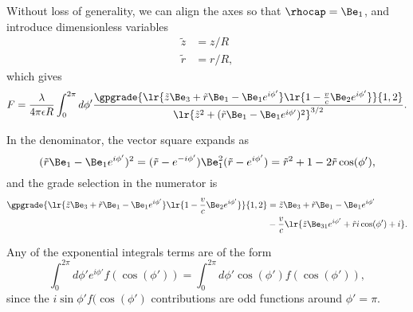 Without loss of generality, we can align the axes so that \( \rhocap = \Be_1 \), and
introduce dimensionless variables
\begin{equation}\label{eqn:ringField:100}
\begin{aligned}
\tilde{z} &= z/R \\
\tilde{r} &= r/R,
\end{aligned}
\end{equation}
which gives
\begin{dmath}\label{eqn:ringField:120}
F
= \frac{\lambda}{4 \pi \epsilon R} \int_0^{2\pi} d\phi' \frac{\gpgrade{ \lr{ \tilde{z} \Be_3 + \tilde{r} \Be_1 - \Be_1 e^{i\phi'} } \lr{ 1 - \frac{v}{c} \Be_2 e^{i\phi'} } }{1,2} } { \lr{ \tilde{z}^2 + (\tilde{r} \Be_1 - \Be_1 e^{i\phi'})^2}^{3/2} }.
\end{dmath}

In the denominator, the vector square expands as
\begin{dmath}\label{eqn:ringField:140}
(\tilde{r} \Be_1 - \Be_1 e^{i\phi'})^2
=
(\tilde{r} - e^{-i\phi'}) \Be_1^2 (\tilde{r} - e^{i\phi'})
=
\tilde{r}^2 + 1 - 2 \tilde{r} \cos(\phi'),
\end{dmath}
and the grade selection in the numerator is
\begin{equation}\label{eqn:ringField:160}
\begin{aligned}
\gpgrade{ \lr{ \tilde{z} \Be_3 + \tilde{r} \Be_1 - \Be_1 e^{i\phi'} } \lr{ 1 - \frac{v}{c} \Be_2 e^{i\phi'}}}{1,2}
&=
\tilde{z} \Be_3 + \tilde{r} \Be_1 - \Be_1 e^{i\phi'} \\
&-\frac{v}{c}\lr{ \tilde{z} \Be_{31} e^{i\phi'} + \tilde{r} i \cos(\phi') + i }.
\end{aligned}
\end{equation}

Any of the exponential integrals terms
are of the form
\begin{equation}\label{eqn:ringField:180}
\int_0^{2\pi} d\phi' e^{i\phi'} f(\cos(\phi')) = \int_0^{2\pi} d\phi' \cos(\phi') f(\cos(\phi')),
\end{equation}
since the \( i \sin\phi' f(\cos(\phi') \) contributions are odd functions around \( \phi' = \pi \).

